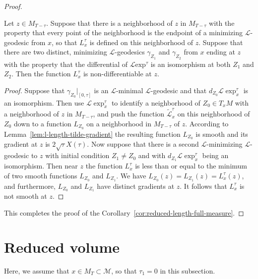 \begin{proof}
\begin{claim}\label{claim:l-length-nondifferentiable-at-multiple-geodesics}
Let $z\in M_{T-\tau}$. Suppose that there is a neighborhood of $z$ in
$M_{T-\tau}$ with the property that every point of the neighborhood is the
endpoint of a minimizing ${\mathcal L}$-geodesic from $x$, so that $L^\tau_x$
is defined on this neighborhood of $z$. Suppose that there are two distinct,
minimizing ${\mathcal L}$-geodesics $\gamma_{Z_1}$ and $\gamma_{Z_2}$ from $x$
ending at $z$ with the property that the differential of ${\mathcal L}\mathrm{exp}^{\tau}$ is an isomorphism at both $Z_1$ and $Z_2$. Then the function
$L^\tau_x$ is non-differentiable at $z$.
\end{claim}

\begin{proof}
 Suppose that
$\gamma_{Z_0}|_{[0,\tau]}$ is an ${\mathcal L}$-minimal ${\mathcal L}$-geodesic
and that $d_{Z_0}{\mathcal L}\exp_x^\tau$ is an isomorphism. Then use
${\mathcal L}\exp_x^{\tau}$ to identify a neighborhood of $Z_0\in T_xM$
with a neighborhood of $z$ in $M_{T-\tau}$, and push  the function
$\widetilde{\mathcal L}^\tau_x$ on this neighborhood of $Z_0$ down to a
function $L_{Z_0}$ on a neighborhood in $M_{T-\tau}$ of $z$. According to
Lemma~\ref{lem:l-length-tilde-gradient} the resulting function $L_{Z_0}$ is smooth and its gradient
at $z$ is $2\sqrt{\tau}X(\tau)$. Now suppose that there is a second ${\mathcal
L}$-minimizing ${\mathcal L}$-geodesic to $z$ with initial condition
$Z_1\not=Z_0$ and with $d_{Z_1}{\mathcal L}\exp_x^\tau$ being an
isomorphism. Then near $z$ the function $L_x^{\tau}$ is less than or equal to
the minimum of two smooth functions $L_{Z_0}$ and $L_{Z_1}$. We have
$L_{Z_0}(z)=L_{Z_1}(z)=L_x^\tau(z)$,  and furthermore, $L_{Z_0}$ and $L_{Z_1}$
have distinct gradients at $z$. It follows that $L_x^{\tau}$ is not smooth at
$z$.
\end{proof}

This completes the proof of the Corollary~\ref{cor:reduced-length-full-measure}.
\end{proof}


\section{Reduced volume}

Here, we  assume that $x\in M_T\subset {\mathcal M}$, so that
$\tau_1=0$ in this subsection.


